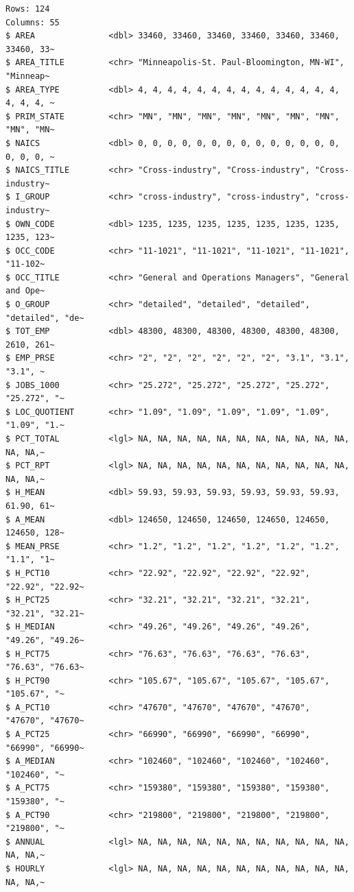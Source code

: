 \documentclass[
  letterpaper,
  DIV=11,
  numbers=noendperiod]{scrartcl}
\begin{document}
\begin{verbatim}
Rows: 124
Columns: 55
$ AREA               <dbl> 33460, 33460, 33460, 33460, 33460, 33460, 33460, 33~
$ AREA_TITLE         <chr> "Minneapolis-St. Paul-Bloomington, MN-WI", "Minneap~
$ AREA_TYPE          <dbl> 4, 4, 4, 4, 4, 4, 4, 4, 4, 4, 4, 4, 4, 4, 4, 4, 4, ~
$ PRIM_STATE         <chr> "MN", "MN", "MN", "MN", "MN", "MN", "MN", "MN", "MN~
$ NAICS              <dbl> 0, 0, 0, 0, 0, 0, 0, 0, 0, 0, 0, 0, 0, 0, 0, 0, 0, ~
$ NAICS_TITLE        <chr> "Cross-industry", "Cross-industry", "Cross-industry~
$ I_GROUP            <chr> "cross-industry", "cross-industry", "cross-industry~
$ OWN_CODE           <dbl> 1235, 1235, 1235, 1235, 1235, 1235, 1235, 1235, 123~
$ OCC_CODE           <chr> "11-1021", "11-1021", "11-1021", "11-1021", "11-102~
$ OCC_TITLE          <chr> "General and Operations Managers", "General and Ope~
$ O_GROUP            <chr> "detailed", "detailed", "detailed", "detailed", "de~
$ TOT_EMP            <dbl> 48300, 48300, 48300, 48300, 48300, 48300, 2610, 261~
$ EMP_PRSE           <chr> "2", "2", "2", "2", "2", "2", "3.1", "3.1", "3.1", ~
$ JOBS_1000          <chr> "25.272", "25.272", "25.272", "25.272", "25.272", "~
$ LOC_QUOTIENT       <chr> "1.09", "1.09", "1.09", "1.09", "1.09", "1.09", "1.~
$ PCT_TOTAL          <lgl> NA, NA, NA, NA, NA, NA, NA, NA, NA, NA, NA, NA, NA,~
$ PCT_RPT            <lgl> NA, NA, NA, NA, NA, NA, NA, NA, NA, NA, NA, NA, NA,~
$ H_MEAN             <dbl> 59.93, 59.93, 59.93, 59.93, 59.93, 59.93, 61.90, 61~
$ A_MEAN             <dbl> 124650, 124650, 124650, 124650, 124650, 124650, 128~
$ MEAN_PRSE          <chr> "1.2", "1.2", "1.2", "1.2", "1.2", "1.2", "1.1", "1~
$ H_PCT10            <chr> "22.92", "22.92", "22.92", "22.92", "22.92", "22.92~
$ H_PCT25            <chr> "32.21", "32.21", "32.21", "32.21", "32.21", "32.21~
$ H_MEDIAN           <chr> "49.26", "49.26", "49.26", "49.26", "49.26", "49.26~
$ H_PCT75            <chr> "76.63", "76.63", "76.63", "76.63", "76.63", "76.63~
$ H_PCT90            <chr> "105.67", "105.67", "105.67", "105.67", "105.67", "~
$ A_PCT10            <chr> "47670", "47670", "47670", "47670", "47670", "47670~
$ A_PCT25            <chr> "66990", "66990", "66990", "66990", "66990", "66990~
$ A_MEDIAN           <chr> "102460", "102460", "102460", "102460", "102460", "~
$ A_PCT75            <chr> "159380", "159380", "159380", "159380", "159380", "~
$ A_PCT90            <chr> "219800", "219800", "219800", "219800", "219800", "~
$ ANNUAL             <lgl> NA, NA, NA, NA, NA, NA, NA, NA, NA, NA, NA, NA, NA,~
$ HOURLY             <lgl> NA, NA, NA, NA, NA, NA, NA, NA, NA, NA, NA, NA, NA,~

\end{verbatim}
\end{document}
